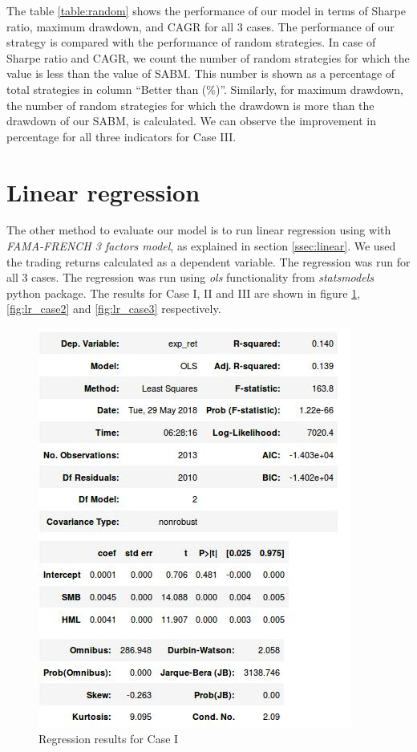 The table \ref{table:random} shows the performance of our model in terms of Sharpe ratio, maximum drawdown, and CAGR for all 3 cases. The performance of our strategy is compared with the performance of random strategies. In case of Sharpe ratio and CAGR, we count the number of random strategies for which the value is less than the value of SABM. This number is shown as a percentage of total strategies in column ``Better than (\%)''. Similarly, for maximum drawdown, the number of random strategies for which the drawdown is more than the drawdown of our SABM, is calculated. We can observe the improvement in percentage for all three indicators for Case III. 


\section{Linear regression}
The other method to evaluate our model is to run linear regression using with \textit{FAMA-FRENCH 3 factors model}, as explained in section \ref{ssec:linear}.
We used the trading returns calculated as a dependent variable. The regression was run for all 3 cases. The regression was run using \textit{ols} functionality from \textit{statsmodels} python package. The results for Case I, II and III are shown in figure \ref{fig:lr_case1}, \ref{fig:lr_case2} and \ref{fig:lr_case3} respectively.

\begin{figure}[h!] 
\centering
 \includegraphics[width=0.75\linewidth]{figures/regression_yearly.jpeg}
\caption{Regression results for Case I}
\label{fig:lr_case1}
\end{figure}


